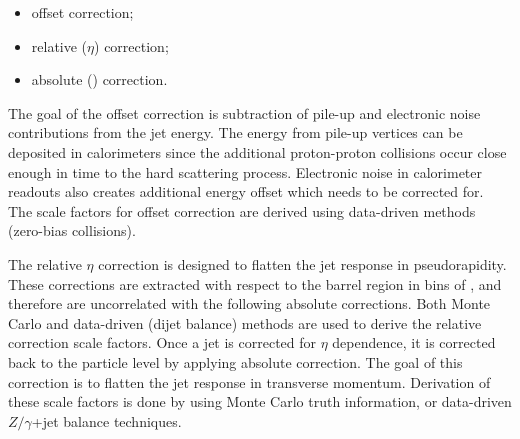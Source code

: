 \begin{itemize}
  \item offset correction;
  \item relative ($\eta$) correction;
  \item absolute (\pt) correction.
\end{itemize}

The goal of the offset correction is subtraction of pile-up and electronic noise contributions from the jet energy. The
energy from pile-up vertices can be deposited in calorimeters since the additional proton-proton collisions occur close
enough in time to the hard scattering process. Electronic noise in calorimeter readouts also creates additional energy
offset which needs to be corrected for. The scale factors for offset correction are derived using data-driven methods
(zero-bias collisions).

The relative $\eta$ correction is designed to flatten the jet response in pseudorapidity. These corrections are
extracted with respect to the barrel region in bins of \pt, and therefore are uncorrelated with the following absolute
\pt corrections. Both Monte Carlo and data-driven (dijet balance) methods are used to derive the relative correction
scale factors. Once a jet is corrected for $\eta$ dependence, it is corrected back to the particle level by applying
absolute \pt correction. The goal of this correction is to flatten the jet response in transverse momentum. Derivation
of these scale factors is done by using Monte Carlo truth information, or data-driven $Z/\gamma$+jet balance techniques.



